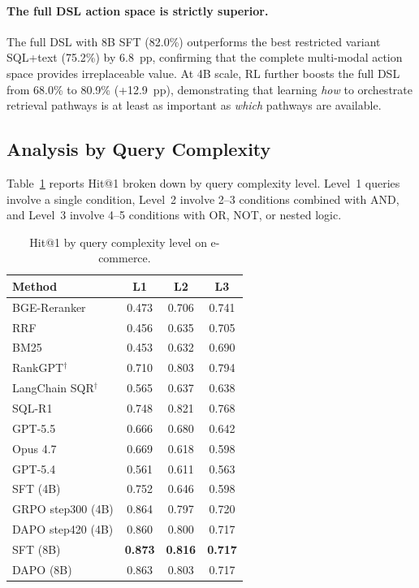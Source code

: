 \documentclass[11pt]{article}
\begin{document}
\paragraph{The full DSL action space is strictly superior.}
The full DSL with 8B SFT (82.0\%) outperforms the best restricted variant SQL+text (75.2\%) by 6.8~pp, confirming that the complete multi-modal action space provides irreplaceable value. At 4B scale, RL further boosts the full DSL from 68.0\% to 80.9\% (+12.9~pp), demonstrating that learning \emph{how} to orchestrate retrieval pathways is at least as important as \emph{which} pathways are available.


\subsection{Analysis by Query Complexity}
\label{sec:complexity}

Table~\ref{tab:complexity} reports Hit@1 broken down by query complexity level. Level~1 queries involve a single condition, Level~2 involve 2--3 conditions combined with AND, and Level~3 involve 4--5 conditions with OR, NOT, or nested logic.

\begin{table}[t]
\centering
\small
\caption{Hit@1 by query complexity level on e-commerce.}
\label{tab:complexity}
\begin{tabular}{lccc}
\toprule
\textbf{Method} & \textbf{L1} & \textbf{L2} & \textbf{L3} \\
\midrule
BGE-Reranker & 0.473 & 0.706 & 0.741 \\
RRF & 0.456 & 0.635 & 0.705 \\
BM25 & 0.453 & 0.632 & 0.690 \\
\midrule
RankGPT$^\dagger$ & 0.710 & 0.803 & 0.794 \\
LangChain SQR$^\dagger$ & 0.565 & 0.637 & 0.638 \\
\midrule
SQL-R1 & 0.748 & 0.821 & 0.768 \\
\midrule
GPT-5.5 & 0.666 & 0.680 & 0.642 \\
Opus 4.7 & 0.669 & 0.618 & 0.598 \\
GPT-5.4 & 0.561 & 0.611 & 0.563 \\
\midrule
SFT (4B) & 0.752 & 0.646 & 0.598 \\
GRPO step300 (4B) & 0.864 & 0.797 & 0.720 \\
DAPO step420 (4B) & 0.860 & 0.800 & 0.717 \\
SFT (8B) & \textbf{0.873} & \textbf{0.816} & \textbf{0.717} \\
DAPO (8B) & 0.863 & 0.803 & 0.717 \\
\bottomrule
\end{tabular}
\end{table}
\end{document}
